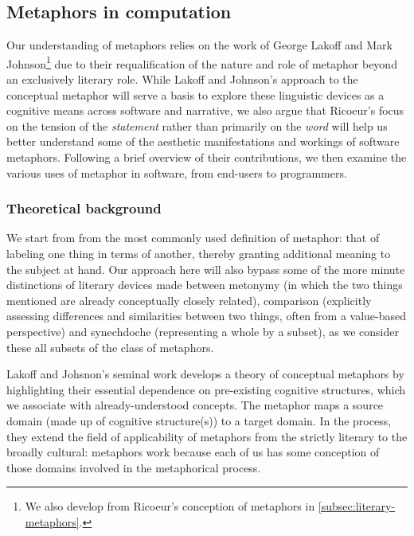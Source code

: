 \subsection{Metaphors in computation}
\label{subsec:metaphor-computation}

Our understanding of metaphors relies on the work of George Lakoff and Mark Johnson\footnote{We also develop from Ricoeur's conception of metaphors in \autoref{subsec:literary-metaphors}.} due to their requalification of the nature and role of metaphor beyond an exclusively literary role. While Lakoff and Johnson's approach to the conceptual metaphor will serve a basis to explore these linguistic devices as a cognitive means across software and narrative, we also argue that Ricoeur's focus on the tension of the \emph{statement} rather than primarily on the \emph{word} will help us better understand some of the aesthetic manifestations and workings of software metaphors. Following a brief overview of their contributions, we then examine the various uses of metaphor in software, from end-users to programmers.

\subsubsection{Theoretical background}
\label{subsubsec:metaphors-background}

We start from from the most commonly used definition of metaphor: that of labeling one thing in terms of another, thereby granting additional meaning to the subject at hand. Our approach here will also bypass some of the more minute distinctions of literary devices made between metonymy (in which the two things mentioned are already conceptually closely related), comparison (explicitly assessing differences and similarities between two things, often from a value-based perspective) and synechdoche (representing a whole by a subset), as we consider these all subsets of the class of metaphors.

Lakoff and Johsnon's seminal work develops a theory of conceptual metaphors by highlighting their essential dependence on pre-existing cognitive structures, which we associate with already-understood concepts. The metaphor maps a source domain (made up of cognitive structure(s)) to a target domain. In the process, they extend the field of applicability of metaphors from the strictly literary to the broadly cultural: metaphors work because each of us has some conception of those domains involved in the metaphorical process.

